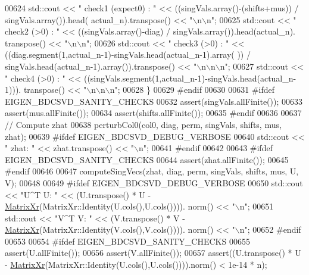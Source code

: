 \begin{DoxyCode}
00624     std::cout << \textcolor{stringliteral}{"    check1 (expect0) : "} << ((singVals.array()-(shifts+mus)) / singVals.array()).head(
      actual\_n).transpose() << \textcolor{stringliteral}{"\(\backslash\)n\(\backslash\)n"};
00625     std::cout << \textcolor{stringliteral}{"    check2 (>0)      : "} << ((singVals.array()-diag) / singVals.array()).head(actual\_n).
      transpose() << \textcolor{stringliteral}{"\(\backslash\)n\(\backslash\)n"};
00626     std::cout << \textcolor{stringliteral}{"    check3 (>0)      : "} << ((diag.segment(1,actual\_n-1)-singVals.head(actual\_n-1).array(
      )) / singVals.head(actual\_n-1).array()).transpose() << \textcolor{stringliteral}{"\(\backslash\)n\(\backslash\)n\(\backslash\)n"};
00627     std::cout << \textcolor{stringliteral}{"    check4 (>0)      : "} << ((singVals.segment(1,actual\_n-1)-singVals.head(actual\_n-1))).
      transpose() << \textcolor{stringliteral}{"\(\backslash\)n\(\backslash\)n\(\backslash\)n"};
00628   \}
00629 \textcolor{preprocessor}{#endif}
00630   
00631 \textcolor{preprocessor}{#ifdef EIGEN\_BDCSVD\_SANITY\_CHECKS}
00632   assert(singVals.allFinite());
00633   assert(mus.allFinite());
00634   assert(shifts.allFinite());
00635 \textcolor{preprocessor}{#endif}
00636   
00637   \textcolor{comment}{// Compute zhat}
00638   perturbCol0(col0, diag, perm, singVals, shifts, mus, zhat);
00639 \textcolor{preprocessor}{#ifdef  EIGEN\_BDCSVD\_DEBUG\_VERBOSE}
00640   std::cout << \textcolor{stringliteral}{"  zhat: "} << zhat.transpose() << \textcolor{stringliteral}{"\(\backslash\)n"};
00641 \textcolor{preprocessor}{#endif}
00642   
00643 \textcolor{preprocessor}{#ifdef EIGEN\_BDCSVD\_SANITY\_CHECKS}
00644   assert(zhat.allFinite());
00645 \textcolor{preprocessor}{#endif}
00646   
00647   computeSingVecs(zhat, diag, perm, singVals, shifts, mus, U, V);
00648   
00649 \textcolor{preprocessor}{#ifdef  EIGEN\_BDCSVD\_DEBUG\_VERBOSE}
00650   std::cout << \textcolor{stringliteral}{"U^T U: "} << (U.transpose() * U - \hyperlink{group___core___module}{MatrixXr}(MatrixXr::Identity(U.cols(),U.cols()))).
      norm() << \textcolor{stringliteral}{"\(\backslash\)n"};
00651   std::cout << \textcolor{stringliteral}{"V^T V: "} << (V.transpose() * V - \hyperlink{group___core___module}{MatrixXr}(MatrixXr::Identity(V.cols(),V.cols()))).
      norm() << \textcolor{stringliteral}{"\(\backslash\)n"};
00652 \textcolor{preprocessor}{#endif}
00653   
00654 \textcolor{preprocessor}{#ifdef EIGEN\_BDCSVD\_SANITY\_CHECKS}
00655   assert(U.allFinite());
00656   assert(V.allFinite());
00657   assert((U.transpose() * U - \hyperlink{group___core___module}{MatrixXr}(MatrixXr::Identity(U.cols(),U.cols()))).norm() < 1e-14 * n);

\end{DoxyCode}
